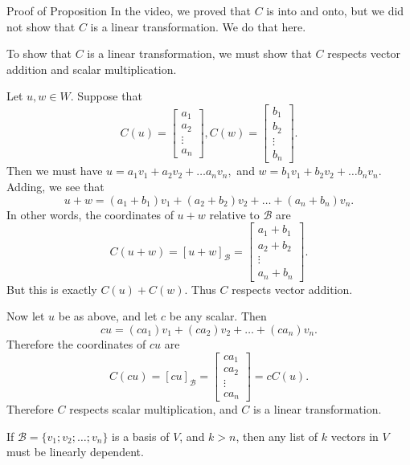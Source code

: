 \begin{edXshowhide}{Proof of Proposition}
In the video, we proved that $C$ is into and onto, but we did not show that $C$ is a linear transformation.
We do that here.  

To show that $C$ is a linear transformation, we must show that $C$ respects vector addition and 
scalar multiplication.  

Let $u, w \in W$.  Suppose that
\[
C(u) = \left[ \begin{array}{c} a_1 \\ a_2 \\ \vdots \\ a_n \end{array} \right], 
C(w) = \left[ \begin{array}{c} b_1 \\ b_2 \\ \vdots \\ b_n \end{array} \right].\]
Then we must have $u = a_1v_1 + a_2v_2 + \ldots a_n v_n,$ and 
$w = b_1v_1 + b_2v_2 + \ldots b_n v_n.$  Adding, we see that
\[u+w = (a_1+b_1)v_1 + (a_2+b_2)v_2 + \ldots + (a_n+b_n)v_n.\]
In other words, the coordinates of $u+w$ relative to $\mathcal{B}$ are 
\[C(u+w) = [u+w]_{\mathcal{B}} = \left[ \begin{array}{c} a_1+b_1 \\ a_2+b_2 \\ \vdots \\ a_n+b_n \end{array} \right].\]
But this is exactly $C(u) + C(w)$.  Thus $C$ respects vector addition.  

Now let $u$ be as above, and let $c$ be any scalar.  Then 
\[cu = (ca_1)v_1 + (ca_2)v_2 + \ldots + (ca_n)v_n.\]
Therefore the coordinates of $cu$ are
\[C(cu) = [cu]_{\mathcal{B}} = \left[ \begin{array}{c} ca_1 \\ ca_2 \\ \vdots \\ ca_n \end{array} \right] =
cC(u).\]
Therefore $C$ respects scalar multiplication, and $C$ is a linear transformation.  




\end{edXshowhide}



{}  If $\mathcal{B}  = \{v_1; v_2; \ldots ; v_n\}$ is a basis of $V$, and $k>n$, then any list
of $k$ vectors in $V$ must be linearly dependent.  

